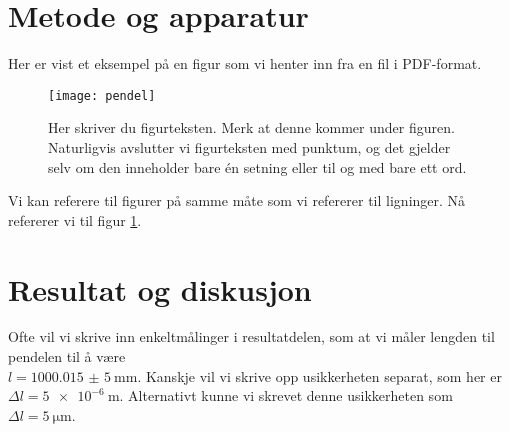 \documentclass[5p]{elsarticle}	            	%
\begin{document}
\section{Metode og apparatur}

Her er vist et eksempel på en figur som vi henter inn fra en fil i PDF-format.

\begin{figure}[htb] 
  \begin{center}
      \texttt{[image: pendel]}  %
  \end{center}
  \caption{Her skriver du figurteksten. Merk at denne kommer under figuren. Naturligvis avslutter vi figurteksten med punktum, og det gjelder selv om den inneholder bare én setning eller til og med bare ett ord.}
  \label{MinLilleFigur} %
\end{figure}

Vi kan referere til figurer på samme måte som vi refererer til ligninger. Nå refererer vi til 
figur \ref{MinLilleFigur}.



\section{Resultat og diskusjon}

Ofte vil vi skrive inn enkeltmålinger i resultatdelen, som at vi måler lengden til pendelen til å være\\ $l = \SI{1000,015(5)}{\milli\metre}$. 
Kanskje vil vi skrive opp usikkerheten separat, som her er $\Delta l = \SI{5e-6}{\metre}$.
Alternativt kunne vi skrevet denne usikkerheten som $\Delta l = \SI{5}{\micro \metre}$.
\end{document}
